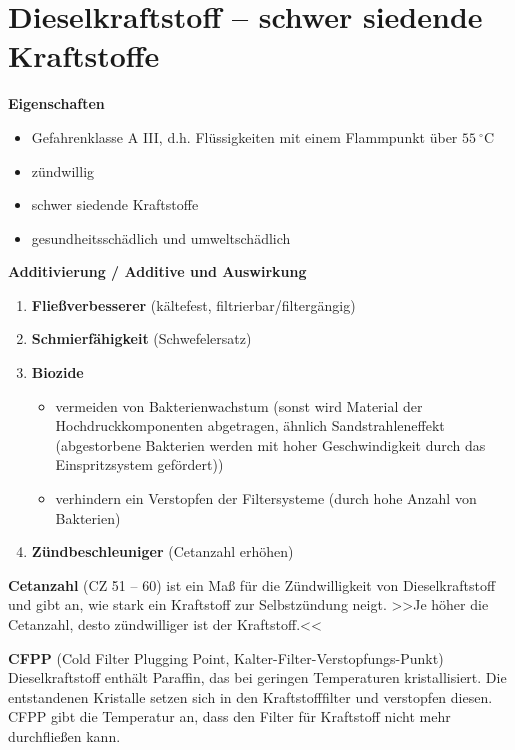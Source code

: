 \section{Dieselkraftstoff -- schwer siedende
Kraftstoffe}\label{dieselkraftstoff-schwer-siedende-kraftstoffe}

\textbf{Eigenschaften}

\begin{itemize}
\item
  Gefahrenklasse A III, d.h. Flüssigkeiten mit einem Flammpunkt über
  $55~^\circ\text{C}$
\item
  zündwillig
\item
  schwer siedende Kraftstoffe
\item
  gesundheitsschädlich und umweltschädlich
\end{itemize}

\textbf{Additivierung / Additive und Auswirkung}

\begin{enumerate}
\item
  \textbf{Fließverbesserer} (kältefest, filtrierbar/filtergängig)
\item
  \textbf{Schmierfähigkeit} (Schwefelersatz)
\item
  \textbf{Biozide}

  \begin{itemize}
  \item
    vermeiden von Bakterienwachstum (sonst wird Material der
    Hochdruckkomponenten abgetragen, ähnlich Sandstrahleneffekt
    (abgestorbene Bakterien werden mit hoher Geschwindigkeit durch das
    Einspritzsystem gefördert))
  \item
    verhindern ein Verstopfen der Filtersysteme (durch hohe Anzahl von
    Bakterien)
  \end{itemize}
\item
  \textbf{Zündbeschleuniger} (Cetanzahl erhöhen)
\end{enumerate}

\textbf{Cetanzahl} (CZ 51 -- 60) ist ein Maß für die Zündwilligkeit von
Dieselkraftstoff und gibt an, wie stark ein Kraftstoff zur Selbstzündung
neigt. >>Je höher die Cetanzahl, desto zündwilliger ist der
Kraftstoff.<<

\textbf{CFPP} (Cold Filter Plugging Point,
Kalter-Filter-Verstopfungs-Punkt) Dieselkraftstoff enthält Paraffin, das
bei geringen Temperaturen kristallisiert. Die entstandenen Kristalle
setzen sich in den Kraftstofffilter und verstopfen diesen. CFPP gibt die
Temperatur an, dass den Filter für Kraftstoff nicht mehr durchfließen
kann.

